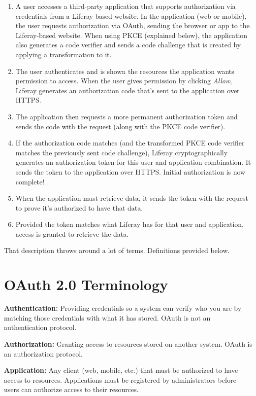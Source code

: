 \begin{enumerate}
\def\labelenumi{\arabic{enumi}.}
\item
  A user accesses a third-party application that supports authorization
  via credentials from a Liferay-based website. In the application (web
  or mobile), the user requests authorization via OAuth, sending the
  browser or app to the Liferay-based website. When using PKCE
  (explained below), the application also generates a code verifier and
  sends a code challenge that is created by applying a transformation to
  it.
\item
  The user authenticates and is shown the resources the application
  wants permission to access. When the user gives permission by clicking
  \emph{Allow}, Liferay generates an authorization code that's sent to
  the application over HTTPS.
\item
  The application then requests a more permanent authorization token and
  sends the code with the request (along with the PKCE code verifier).
\item
  If the authorization code matches (and the transformed PKCE code
  verifier matches the previously sent code challenge), Liferay
  cryptographically generates an authorization token for this user and
  application combination. It sends the token to the application over
  HTTPS. Initial authorization is now complete!
\item
  When the application must retrieve data, it sends the token with the
  request to prove it's authorized to have that data.
\item
  Provided the token matches what Liferay has for that user and
  application, access is granted to retrieve the data.
\end{enumerate}

That description throws around a lot of terms. Definitions provided
below.

\section{OAuth 2.0 Terminology}\label{oauth-2.0-terminology}

\textbf{Authentication:} Providing credentials so a system can verify
who you are by matching those credentials with what it has stored. OAuth
is not an authentication protocol.

\textbf{Authorization:} Granting access to resources stored on another
system. OAuth is an authorization protocol.

\textbf{Application:} Any client (web, mobile, etc.) that must be
authorized to have access to resources. Applications must be registered
by administrators before users can authorize access to their resources.

